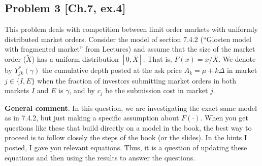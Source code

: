 \documentclass[11pt
, answers
]{exam}
\begin{document}
\quad
\subsection*{Problem 3 [Ch.7, ex.4]}

This problem deals with competition between limit order markets with uniformly distributed market orders. Consider the model of section 7.4.2 (``Glosten model with fragmented market'' from Lectures) and assume that the size of the market order ($\tilde{X}$) has a uniform distribution $[0,\bar{X}]$. That is, $F(x)=x/{\bar{X}}$. We denote by $Y^{*}_{jk}(\gamma)$ the cumulative depth posted at the ask price $A_{k}=\mu+k\Delta$ in market $j \in \{I,E\}$ when the fraction of investors submitting market orders in both markets $I$ and $E$ is $\gamma$, and by $c_{j}$ be the submission cost in market $j$.

\begin{solution}
	\noindent \textbf{General comment}. In this question, we are investigating the exact same model as in 7.4.2, but just making a specific assumption about $F(\cdot)$. When you get questions like these that build directly on a model in the book, the best way to proceed is to follow closely the steps of the book (or the slides). In the hints I posted, I gave you relevant equations. Thus, it is a question of updating these equations and then using the results to answer the questions.
\end{solution}
\end{document}
